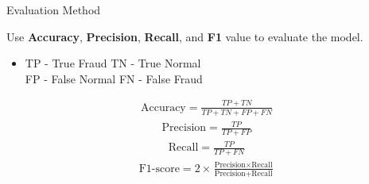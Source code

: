 \documentclass[
 size=14pt,
 paper=smartboard,  %
 mode=present, 		%
 display=slides, 	%
 style=tuliplab,  	%
 pauseslide,
 fleqn,leqno]{powerdot}
\begin{document}
\begin{slide}[toc=,bm=]{Evaluation Method}

Use  \textbf{Accuracy}, \textbf{Precision}, \textbf{Recall}, and \textbf{F1} value to evaluate the model.
\begin{itemize}
\item
TP - True Fraud \quad TN -  True Normal\\
FP - False Normal \quad FN - False Fraud
\end{itemize}

	\begin{align}
	\text{Accuracy} = \frac{TP + TN}{TP + TN + FP + FN}
\end{align}
	\begin{align}
	\text{Precision} = \frac{TP}{TP + FP}
\end{align}
	\begin{align}
	\text{Recall} = \frac{TP}{TP + FN}
\end{align}
	\begin{align}
	\text{F1-score} = 2 \times \frac{\text{Precision} \times \text{Recall}}{\text{Precision} + \text{Recall}}
\end{align}

	
\end{slide}
\end{document}
